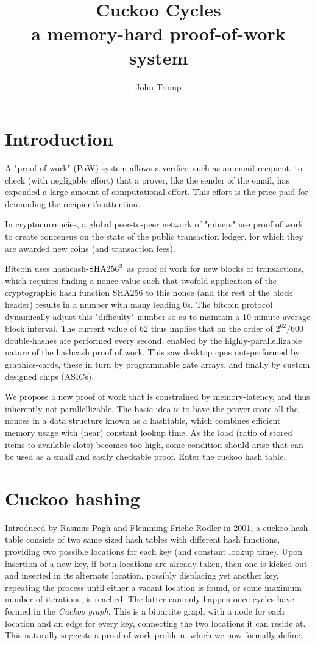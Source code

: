 \documentclass[11pt, oneside]{article}
\title{Cuckoo Cycles \protect\\ a memory-hard proof-of-work system}
\author{John Tromp}
\newcommand{\sha}{{\rm SHA256}}
\begin{document}
\maketitle
\section{Introduction}
A "proof of work" (PoW) system allows a verifier, such as an email recipient,
to check (with negligable effort) that a prover, like the sender of the email,
has expended a large amount of computational effort.
This effort is the price paid for demanding the recipient's attention.

In cryptocurrencies, a global peer-to-peer network of "miners" use proof of
work to create concensus on the state of the public transaction ledger, for
which they are awarded new coins (and transaction fees). 

Bitcoin\cite{nakamoto2009bitcoin} uses hashcash-${\sha}^2$ as proof of work for
new blocks of transactions, which requires finding a nonce value such that
twofold application of the cryptographic hash function SHA256
to this nonce (and the rest of the block header) results in a number with many
leading 0s.  The bitcoin protocol dynamically adjust this "difficulty" number
so as to maintain a 10-minute average block interval. The current value of 62
thus implies that on the order of $2^{62}/600$ double-hashes
are performed every second, enabled by the highly-parallellizable nature of the
hashcash proof of work.  This saw desktop cpus out-performed by graphics-cards,
these in turn by programmable gate arrays,
and finally by custom designed chips (ASICs).

We propose a new proof of work that is constrained by memory-latency, and thus
inherently not parallellizable. The basic idea is to have the prover store all
the nonces in a data structure
known as a hashtable, which combines efficient memory usage with (near) constant
lookup time. As the load (ratio of stored items to available slots) becomes
too high, some condition should arise
that can be used as a small and easily checkable proof.   Enter the cuckoo hash
table.

\section{Cuckoo hashing}
Introduced by Rasmus Pagh and Flemming Friche Rodler in
2001\cite{Pagh01cuckoohashing}, a cuckoo hash table consists of two same sized
hash tables with different hash functions,
providing two possible locations for each key (and constant lookup time).
Upon insertion of a new key, if both locations are already taken,
then one is kicked out and inserted in its alternate location, possibly
displacing yet another key, repeating the process until either a vacant
location is found, or some maximum number of iterations,
is reached. The latter can only happen once cycles have formed in the {\em
Cuckoo graph}.  This is a bipartite graph with a node for each location and an
edge for every key,
connecting the two locations it can reside at. This naturally suggests a proof
of work problem, which we now formally define.
\end{document}
